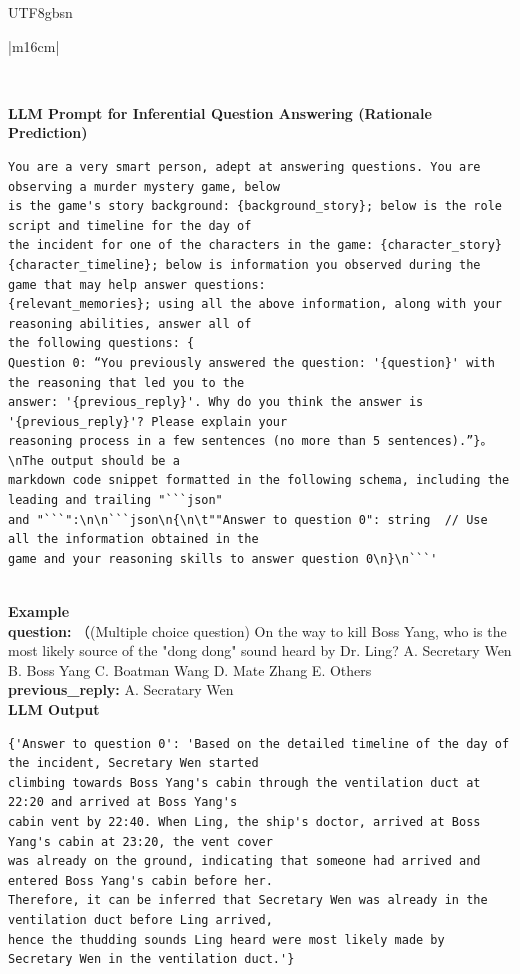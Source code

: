 \documentclass[11pt]{article}
\begin{document}
{\begin{CJK}{UTF8}{gbsn}
\begin{table}[ht!]
\begin{minipage}[t]{\linewidth}
\begin{tabular}{|m{16cm}|}
\begin{minipage}[t]{\linewidth}
\begin{verbatim}
\end{verbatim}
\end{minipage} \\
\hline
{}  {\textbf{LLM Prompt for Inferential Question Answering (Rationale Prediction)}} \\
\begin{minipage}[t]{\linewidth}
\small\begin{verbatim}
You are a very smart person, adept at answering questions. You are observing a murder mystery game, below
is the game's story background: {background_story}; below is the role script and timeline for the day of 
the incident for one of the characters in the game: {character_story}
{character_timeline}; below is information you observed during the game that may help answer questions: 
{relevant_memories}; using all the above information, along with your reasoning abilities, answer all of 
the following questions: {
Question 0: “You previously answered the question: '{question}' with the reasoning that led you to the 
answer: '{previous_reply}'. Why do you think the answer is '{previous_reply}'? Please explain your 
reasoning process in a few sentences (no more than 5 sentences).”}。\nThe output should be a 
markdown code snippet formatted in the following schema, including the leading and trailing "```json"
and "```":\n\n```json\n{\n\t""Answer to question 0": string  // Use all the information obtained in the
game and your reasoning skills to answer question 0\n}\n```'
\end{verbatim}
\end{minipage} \\
\hline
{}  \textbf{Example}  \\
 \textbf{  question:} \small（(Multiple choice question) On the way to kill Boss Yang, who is the most 
 likely source of the "dong dong" sound heard by Dr. Ling? A. Secretary Wen B. Boss Yang C. Boatman Wang
 D. Mate Zhang E. Others \\
  \textbf{  previous\_reply:} \small A. Secratary Wen\\
\hline
{}  \textbf{LLM Output}  \\
\hline
\begin{minipage}[t]{\linewidth}
\small\begin{verbatim}
{'Answer to question 0': 'Based on the detailed timeline of the day of the incident, Secretary Wen started
climbing towards Boss Yang's cabin through the ventilation duct at 22:20 and arrived at Boss Yang's
cabin vent by 22:40. When Ling, the ship's doctor, arrived at Boss Yang's cabin at 23:20, the vent cover
was already on the ground, indicating that someone had arrived and entered Boss Yang's cabin before her.
Therefore, it can be inferred that Secretary Wen was already in the ventilation duct before Ling arrived, 
hence the thudding sounds Ling heard were most likely made by Secretary Wen in the ventilation duct.'}


\end{verbatim}
\end{minipage}
\end{tabular}
\end{minipage}
\end{table}
\end{CJK}}
\end{document}
